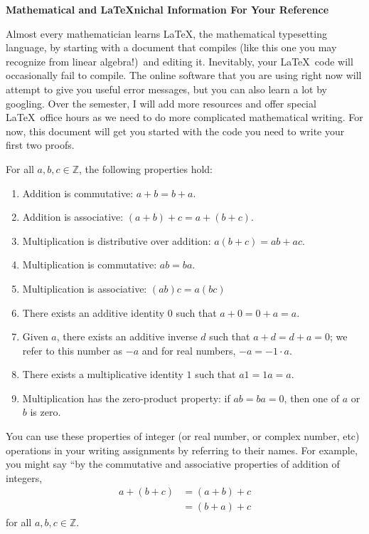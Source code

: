 \documentclass{article}
\begin{document}
\noindent\textbf{\Large Mathematical and \LaTeX{}nichal Information For Your Reference}

Almost every mathematician learns \LaTeX, the mathematical typesetting language, by starting with a document that compiles (like this one you may recognize from linear algebra!)\ and editing it.  Inevitably, your \LaTeX\ code will occasionally fail to compile.  The online software that you are using right now will attempt to give you useful error messages, but you can also learn a lot by googling.  Over the semester, I will add more resources and offer special \LaTeX\ office hours as we need to do more complicated mathematical writing.  For now, this document will get you started with the code you need to write your first two proofs.

\begin{prop*} For all $a,b,c \in \mathbb{Z}$, the following properties hold:
\begin{enumerate}
\item Addition is commutative: $a+b = b+a$.
\item Addition is associative: $(a+b)+c = a+(b+c)$.
\item Multiplication is distributive over addition: $a(b+c) = ab + ac$.
\item Multiplication is commutative: $ab = ba$.
\item Multiplication is associative: $(ab)c=a(bc)$
\item There exists an additive identity $0$ such that $a + 0 = 0 + a = a$.
\item Given $a$, there exists an additive inverse $d$ such that $a+d = d+a = 0$; we refer to this number as $-a$ and for real numbers, $-a = -1\cdot a$.
\item There exists a multiplicative identity $1$ such that $a1 = 1a = a$.\textbf{}
\item Multiplication has the zero-product property: if $ab = ba = 0$, then one of $a$ or $b$ is zero.
\end{enumerate}
\end{prop*}
 
You can use these properties of integer (or real number, or complex number, etc) operations in your writing assignments by referring to their names.  For example, you might say ``by the commutative and associative properties of addition of integers, 
\begin{align*}
a + (b + c) 
    &= (a + b) + c\\ 
    &= (b + a) + c
\end{align*}
for all $a,b,c \in \mathbb{Z}$.
\end{document}
